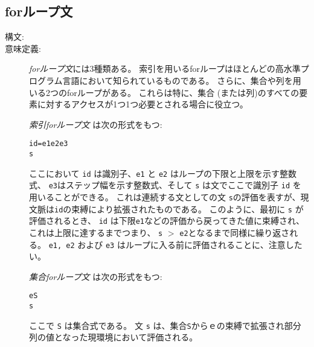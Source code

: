 \documentclass[\pformat,12pt]{jarticle}
\begin{document}
\subsection{forループ文}

\begin{description}
\item[構文:]




\item[意味定義:] {\it forループ文}には3種類ある。
索引を用いるforループはほとんどの高水準プログラム言語において知られているものである。
さらに、集合や列を用いる2つのforループがある。
これらは特に、集合 (または列)のすべての要素に対するアクセスが1つ1つ必要とされる場合に役立つ。

 {\it 索引forループ文} は次の形式をもつ:
  \begin{alltt}
     id = e1  e2  e3 
    s
  \end{alltt}
 ここにおいて {\tt id} は識別子、{\tt e1} と {\tt e2} はループの下限と上限を示す整数式、 {\tt e3}はステップ幅を示す整数式、そして {\tt s} は文でここで識別子 {\tt id} を用いることができる。
これは連続する文としての文 {\tt s}の評価を表すが、現文脈は{\tt id}の束縛により拡張されたものである。
このように、最初に {\tt s} が評価されるとき、 {\tt id} は下限{\tt e1}などの評価から戻ってきた値に束縛され、これは上限に達するまでつまり、 \texttt{s} $>$ \texttt{e2}となるまで同様に繰り返される。 
{\tt e1, e2} および {\tt e3} はループに入る前に評価されることに、注意したい。

 {\it 集合forループ文\/} は次の形式をもつ:
  \begin{alltt}
     e  S 
    s
  \end{alltt}
 ここで {\tt S} は集合式である。
文 {\tt s} は、集合{\tt S}からｅの束縛で拡張され部分列の値となった現環境において評価される。


\end{description}
\end{document}

